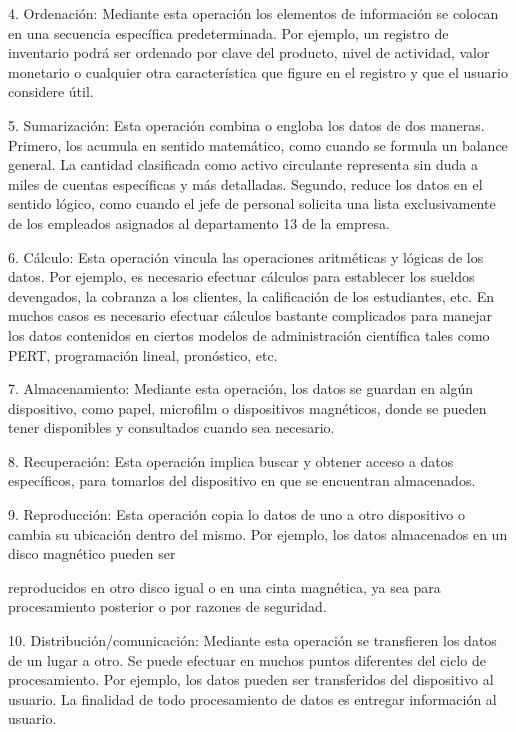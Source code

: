 4. Ordenación: Mediante esta operación los elementos de información se colocan en una secuencia específica predeterminada. Por ejemplo, un registro de inventario podrá ser ordenado por clave del producto, nivel de actividad, valor monetario o cualquier otra característica que figure en el registro y que el usuario considere útil.

5. Sumarización: Esta operación combina o engloba los datos de dos maneras. Primero, los acumula en sentido matemático, como cuando se formula un balance general. La cantidad clasificada como activo circulante representa sin duda a miles de cuentas específicas y más detalladas. Segundo, reduce los datos en el sentido lógico, como cuando el jefe de personal solicita una lista exclusivamente de los empleados asignados al departamento 13 de la empresa.

6. Cálculo: Esta operación vincula las operaciones aritméticas y lógicas de los datos. Por ejemplo, es necesario efectuar cálculos para establecer los sueldos devengados, la cobranza a los clientes, la calificación de los estudiantes, etc. En muchos casos es necesario efectuar cálculos bastante complicados para manejar los datos contenidos en ciertos modelos de administración científica tales como PERT, programación lineal, pronóstico, etc.

7. Almacenamiento: Mediante esta operación, los datos se guardan en algún dispositivo, como papel, microfilm o dispositivos magnéticos, donde se pueden tener disponibles y consultados cuando sea necesario.

8. Recuperación: Esta operación implica buscar y obtener acceso a datos específicos, para tomarlos del dispositivo en que se encuentran almacenados.

9. Reproducción: Esta operación copia lo datos de uno a otro dispositivo o cambia su ubicación dentro del mismo. Por ejemplo, los datos almacenados en un disco magnético pueden ser



reproducidos en otro disco igual o en una cinta magnética, ya sea para procesamiento posterior o por razones de seguridad.

10. Distribución/comunicación: Mediante esta operación se transfieren los datos de un lugar a otro. Se puede efectuar en muchos puntos diferentes del ciclo de procesamiento. Por ejemplo, los datos pueden ser transferidos del dispositivo al usuario. La finalidad de todo procesamiento de datos es entregar información al usuario.

